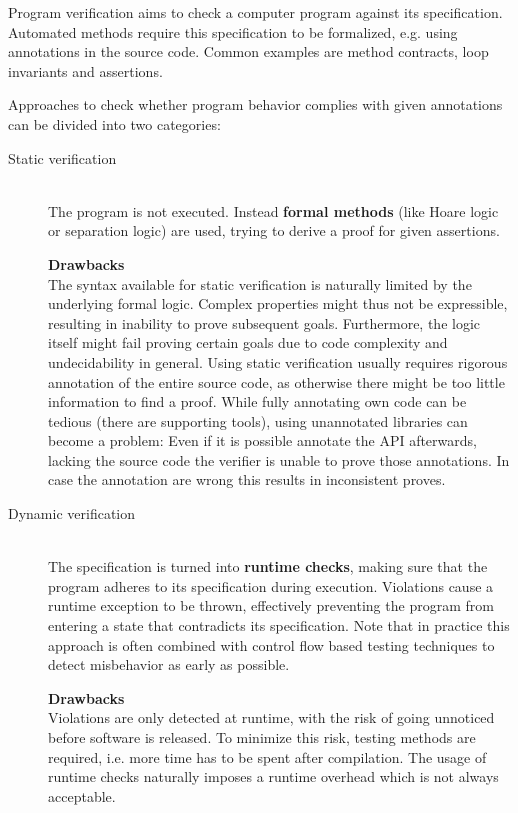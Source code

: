 Program verification aims to check a computer program against its specification.
Automated methods require this specification to be formalized, e.g. using annotations in the source code.
Common examples are method contracts, loop invariants and assertions.

Approaches to check whether program behavior complies with given annotations can be divided into two categories:
\begin{description}
    \item[Static verification]~\\
        The program is not executed. 
        Instead \textbf{formal methods} (like Hoare logic or separation logic) are used, trying to derive a proof for given assertions.
        
        \textbf{Drawbacks}\\
        The syntax available for static verification is naturally limited by the underlying formal logic.
        Complex properties might thus not be expressible, resulting in inability to prove subsequent goals.
        Furthermore, the logic itself might fail proving certain goals due to code complexity and undecidability in general.
        Using static verification usually requires rigorous annotation of the entire source code, as otherwise there might be too little information to find a proof.
        While fully annotating own code can be tedious (there are supporting tools), using unannotated libraries can become a problem:
        Even if it is possible annotate the API afterwards, lacking the source code the verifier is unable to prove those annotations.
        In case the annotation are wrong this results in inconsistent proves.
        
    \item[Dynamic verification]~\\
        The specification is turned into \textbf{runtime checks}, making sure that the program adheres to its specification during execution.
        Violations cause a runtime exception to be thrown, effectively preventing the program from entering a state that contradicts its specification.
        Note that in practice this approach is often combined with control flow based testing techniques to detect misbehavior as early as possible.
        
        \textbf{Drawbacks}\\
        Violations are only detected at runtime, with the risk of going unnoticed before software is released.
        To minimize this risk, testing methods are required, i.e. more time has to be spent after compilation.
        The usage of runtime checks naturally imposes a runtime overhead which is not always acceptable.
\end{description}


